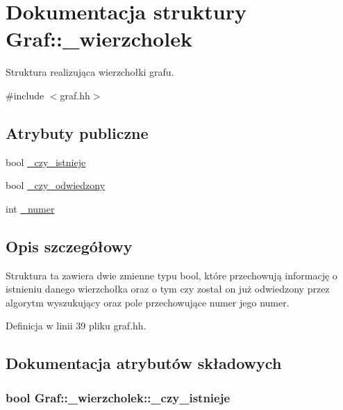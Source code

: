 \hypertarget{struct_graf_1_1__wierzcholek}{\section{\-Dokumentacja struktury \-Graf\-:\-:\-\_\-wierzcholek}
\label{struct_graf_1_1__wierzcholek}
}


\-Struktura realizująca wierzchołki grafu.  




{\ttfamily \#include $<$graf.\-hh$>$}

\subsection*{\-Atrybuty publiczne}
\begin{DoxyCompactItemize}
\item 
bool \hyperlink{struct_graf_1_1__wierzcholek_a157d209583d1813f1a609cfb08682ffe}{\-\_\-czy\-\_\-istnieje}
\item 
bool \hyperlink{struct_graf_1_1__wierzcholek_a818c370b6e8a476f6fb9f89ccac01e2f}{\-\_\-czy\-\_\-odwiedzony}
\item 
int \hyperlink{struct_graf_1_1__wierzcholek_a966ecd51ba3e337c8b67587cffab7f9a}{\-\_\-numer}
\end{DoxyCompactItemize}


\subsection{\-Opis szczegółowy}
\-Struktura ta zawiera dwie zmienne typu bool, które przechowują informację o istnieniu danego wierzchołka oraz o tym czy został on już odwiedzony przez algorytm wyszukujący oraz pole przechowujące numer jego numer. 

\-Definicja w linii 39 pliku graf.\-hh.



\subsection{\-Dokumentacja atrybutów składowych}
\hypertarget{struct_graf_1_1__wierzcholek_a157d209583d1813f1a609cfb08682ffe}{
\subsubsection[{\-\_\-czy\-\_\-istnieje}]{\setlength{\rightskip}{0pt plus 5cm}bool {\bf \-Graf\-::\-\_\-wierzcholek\-::\-\_\-czy\-\_\-istnieje}}}\label{struct_graf_1_1__wierzcholek_a157d209583d1813f1a609cfb08682ffe}


